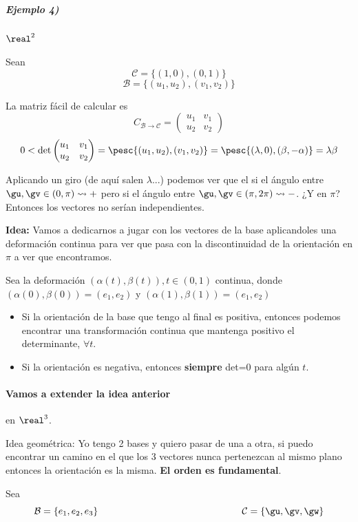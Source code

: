\subparagraph{Ejemplo 4)} $\real^2$

Sean \[\mathcal{C} = \{(1,0),(0,1)\}\]
\[\mathcal{B} = \{(u_1,u_2),(v_1,v_2)\}\]

La matriz fácil de calcular es \[C_{\mathcal{B}\to \mathcal{C}} = \begin{pmatrix} u_1&v_1\\u_2&v_2\end{pmatrix}\]
\[0<\det \begin{pmatrix} u_1&v_1\\u_2&v_2\end{pmatrix}  = \pesc{(u_1,u_2),(v_1,v_2)} = \pesc{(\lambda,0),(\beta,-\alpha)} = \lambda\beta\]

Aplicando un giro (de aquí salen $\lambda$...) podemos ver que el si el ángulo entre $\gu,\gv \in (0,\pi) \leadsto +$ pero si el ángulo entre $\gu,\gv \in (\pi,2\pi) \leadsto -$. ¿Y en $\pi$? Entonces los vectores no serían independientes.

\textbf{Idea:} Vamos a dedicarnos a jugar con los vectores de la base aplicandoles una deformación continua para ver que pasa con la discontinuidad de la orientación en $\pi$ a ver que encontramos.

Sea la deformación $(\alpha(t),\beta(t)), t\in(0,1)$ continua, donde $(\alpha(0),\beta(0)) = (e_1,e_2)$ y $(\alpha(1),\beta(1)) = (e_1,e_2)$

\begin{itemize}
\item
Si la orientación de la base que tengo al final es positiva, entonces podemos encontrar una transformación continua que mantenga positivo el determinante, $\forall t$. 
\item
Si la orientación es negativa, entonces \textbf{siempre} det=0 para algún $t$.
\end{itemize}

\paragraph{Vamos a extender la idea anterior} en $\real^3$.

Idea geométrica: Yo tengo 2 bases y quiero pasar de una a otra, si puedo encontrar un camino en el que los 3 vectores nunca pertenezcan al mismo plano entonces la orientación es la misma. \textbf{El orden es fundamental}. 

Sea 
\[\mathcal{B} = \{e_1,e_2,e_3\} \hspace*{150pt} \mathcal{C} = \{\gu,\gv,\gw\}\]


